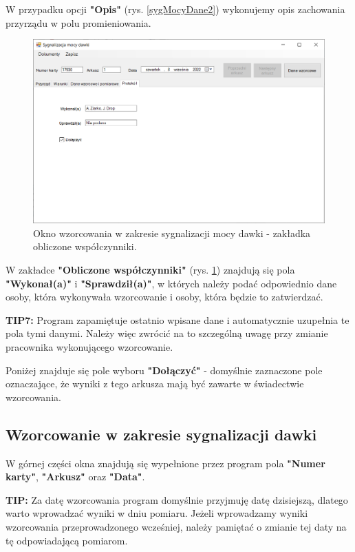 W przypadku opcji \textbf{"Opis"} (rys. \ref{sygMocyDane2}) wykonujemy opis zachowania przyrządu w polu promieniowania.
	
	\begin{figure}[htb]
		\centering
		\includegraphics[width=\columnwidth]{obrazki/Wzorcowanie/syg_mocy_dawki/wspolczynniki.png}
		\caption{Okno wzorcowania w zakresie sygnalizacji mocy dawki - zakładka obliczone współczynniki.}
		\label{sygMocyWspolczynniki}
	\end{figure}
	
	W zakładce \textbf{"Obliczone współczynniki"} (rys. \ref{sygMocyWspolczynniki}) znajdują się pola \textbf{"Wykonał(a)"} i \textbf{"Sprawdził(a)"}, w których należy podać odpowiednio dane osoby, która wykonywała wzorcowanie i osoby, która będzie to zatwierdzać. 
	
	\textbf{TIP7:} Program zapamiętuje ostatnio wpisane dane i automatycznie uzupełnia te pola tymi danymi. Należy więc zwrócić na to szczególną uwagę przy zmianie pracownika wykonującego wzorcowanie.
	
	Poniżej znajduje się pole wyboru \textbf{"Dołączyć"} - domyślnie zaznaczone pole oznaczające, że wyniki z tego arkusza mają być zawarte w świadectwie wzorcowania.

\subsection{Wzorcowanie w zakresie sygnalizacji dawki}
\label{wzorcowanie_syg_dawka}
	
	W górnej części okna znajdują się wypełnione przez program pola \textbf{"Numer karty"}, \textbf{"Arkusz"} oraz \textbf{"Data"}. 
	
	\textbf{TIP:} Za datę wzorcowania program domyślnie przyjmuję datę dzisiejszą, dlatego warto wprowadzać wyniki w dniu pomiaru. Jeżeli wprowadzamy wyniki wzorcowania przeprowadzonego wcześniej, należy pamiętać o zmianie tej daty na tę odpowiadającą pomiarom.
	
